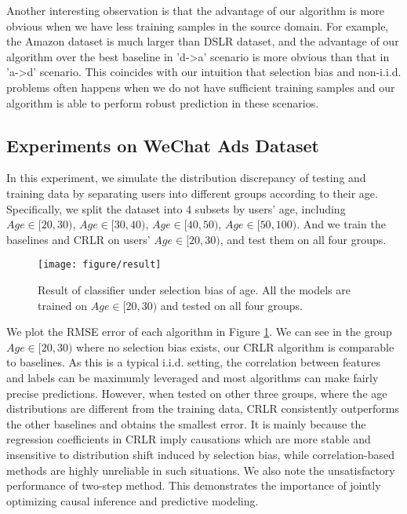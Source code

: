 \documentclass[sigconf]{acmart}
\begin{document}
Another interesting observation is that the advantage of our algorithm is more obvious when we have less training samples in the source domain.
For example, the Amazon dataset is much larger than DSLR dataset, and the advantage of our algorithm over the best baseline in 'd->a' scenario is more obvious than that in 'a->d' scenario.
This coincides with our intuition that selection bias and non-i.i.d. problems often happens when we do not have sufficient training samples and our algorithm is able to perform robust prediction in these scenarios.

\subsection{Experiments on WeChat Ads Dataset}
In this experiment, we simulate the distribution discrepancy of testing and training data by separating users into different groups according to their age.
Specifically, we split the dataset into 4 subsets by users’ age, including $Age \in [20, 30)$, $Age \in [30, 40)$, $Age \in [40, 50)$, $Age \in [50, 100)$.
And we train the baselines and CRLR on users' $Age \in [20, 30)$, and test them on all four groups.

\begin{figure}[h]
\texttt{[image: figure/result]}
\caption{Result of classifier under selection bias of age. All the models are trained on $Age \in [20, 30)$ and tested on all four groups.}
\label{fig:age_bias}
\end{figure}

We plot the RMSE error of each algorithm in Figure \ref{fig:age_bias}.
We can see in the group $Age \in [20,30)$ where no selection bias exists, our CRLR algorithm is comparable to baselines.
As this is a typical i.i.d. setting, the correlation between features and labels can be maximumly leveraged and most algorithms can make fairly precise predictions.
However, when tested on other three groups, where the age distributions are different from the training data, CRLR consistently outperforms the other baselines and obtains the smallest error.
It is mainly because the regression coefficients in CRLR imply causations which are more stable and insensitive to distribution shift induced by selection bias, while correlation-based methods are highly unreliable in such situations.
We also note the unsatisfactory performance of two-step method. This demonstrates the importance of jointly optimizing causal inference and predictive modeling.
\end{document}
